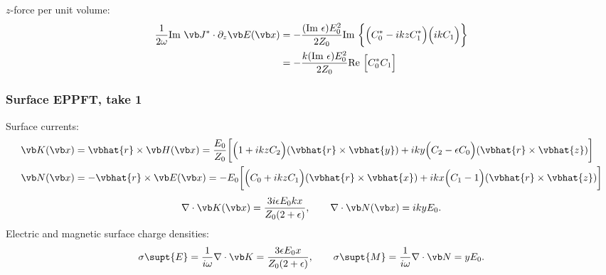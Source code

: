 $z$-force per unit volume:
\begin{align*}
 \frac{1}{2\omega}\text{Im }\vb J^* \cdot \partial_z \vb E(\vb x)
&=-\frac{(\text{Im }\epsilon) E_0^2 }{2 Z_0}\text{Im }
 \bigg\{ \Big(C_0^* - ikz C_1^*\Big)\Big(ikC_1\Big)\bigg\}
\\
&=-\frac{k (\text{Im }\epsilon) E_0^2 }{2 Z_0}\text{Re }
 \Big[ C_0^* C_1 \Big]
\end{align*}

\subsubsection*{Surface EPPFT, take 1}

Surface currents:
\begin{align*} 
 \vb K(\vb x) 
&= \vbhat{r} \times \vb H(\vb x) 
= \frac{E_0}{Z_0}\bigg[ \Big(1+ikz C_2\Big)(\vbhat{r} \times \vbhat{y})
                        +iky \Big(C_2-\epsilon C_0\Big)
                        (\vbhat{r} \times \vbhat{z})
                 \bigg]
\\
 \vb N(\vb x) 
&= -\vbhat{r} \times \vb E(\vb x) 
= -E_0\bigg[ \Big(C_0+ikz C_1\Big)(\vbhat{r} \times \vbhat{x})
             +ikx \Big(C_1-1\Big) (\vbhat{r} \times \vbhat{z})
      \bigg]
\end{align*}
$$
 \nabla \cdot \vb K(\vb x) = \frac{3i\epsilon E_0 kx}{Z_0(2+\epsilon)}, 
\qquad 
 \nabla \cdot \vb N(\vb x) = iky E_0.
$$
Electric and magnetic surface charge densities:
$$ \sigma\supt{E} 
   = \frac{1}{i\omega}\nabla \cdot \vb K
   =\frac{3\epsilon E_0 x}{Z_0 (2+\epsilon)},
  \qquad 
  \sigma\supt{M} 
   = \frac{1}{i\omega}\nabla \cdot \vb N
   = yE_0.
$$

